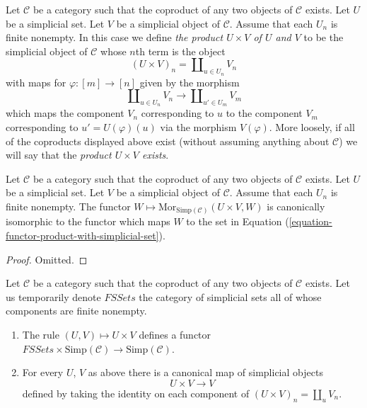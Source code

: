 \begin{definition}
\label{definition-product-with-simplicial-set}
Let $\mathcal{C}$ be a category such that the coproduct of
any two objects of $\mathcal{C}$ exists. Let
$U$ be a simplicial set. Let $V$ be a simplicial
object of $\mathcal{C}$. Assume that each $U_n$ is
finite nonempty. In this case we define
{\it the product 
$
U \times V
$
of $U$ and $V$}
to be the simplicial object of $\mathcal{C}$ whose
$n$th term is the object
$$
(U \times V)_n = \coprod\nolimits_{u\in U_n} V_n
$$
with maps for $\varphi : [m] \to [n]$ given by the
morphism
$$
\coprod\nolimits_{u\in U_n} V_n
\longrightarrow
\coprod\nolimits_{u'\in U_m} V_m
$$
which maps the component $V_n$ corresponding to $u$ to the
component $V_m$ corresponding to $u' = U(\varphi)(u)$
via the morphism $V(\varphi)$.
More loosely, if all of the coproducts displayed above
exist (without assuming anything about $\mathcal{C}$)
we will say that the {\it product $U \times V$ exists}.
\end{definition}

\begin{lemma}
\label{lemma-check-product-with-simplicial-set}
Let $\mathcal{C}$ be a category such that the coproduct of
any two objects of $\mathcal{C}$ exists. Let
$U$ be a simplicial set. Let $V$ be a simplicial
object of $\mathcal{C}$. Assume that each $U_n$ is
finite nonempty. The functor 
$W \mapsto \text{Mor}_{\text{Simp}(\mathcal{C})}(U\times V, W)$
is canonically isomorphic to the functor which
maps $W$ to the set in
Equation (\ref{equation-functor-product-with-simplicial-set}).
\end{lemma}

\begin{proof}
Omitted.
\end{proof}

\begin{lemma}
\label{lemma-back-to-U}
Let $\mathcal{C}$ be a category such that the coproduct of
any two objects of $\mathcal{C}$ exists. Let us temporarily
denote $\textit{FSSets}$ the category of simplicial sets
all of whose components are finite nonempty.
\begin{enumerate}
\item The rule $(U, V) \mapsto U \times V$
defines a functor
$\textit{FSSets} \times \text{Simp}(\mathcal{C})
\to \text{Simp}(\mathcal{C})$.
\item For every $U$, $V$ as above
there is a canonical map of simplicial objects
$$
U \times V \longrightarrow V
$$
defined by taking the identity on each component of
$(U \times V)_n = \coprod_u V_n$.
\end{enumerate}
\end{lemma}

